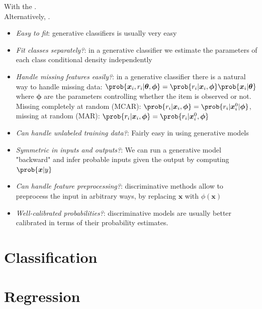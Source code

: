 With the .\\
Alternatively, .

\begin{itemize}
    \item \emph{Easy to fit}: generative classifiers is usually very easy
    \item \emph{Fit classes separately?}: in a generative classifier we estimate the parameters
        of each class conditional density independently
    \item \emph{Handle missing features easily?}: in a generative classifier there is a natural way
        to handle missing data: $\prob{\bm{x}_{i},r_{i}|\bm{\theta},\bm{\phi}} = \prob{r_{i}|\bm{
        x}_{i},\bm{\phi}}\prob{\bm{x}_{i}|\bm{\theta}}$ where $\bm{\phi}$ are the parameters
        controlling whether the item is observed or not. Missing completely at random (MCAR): $\prob{
        r_{i}|\bm{x}_{i},\bm{\phi}} = \prob{r_{i}|\bm{x}^{0}_{i}|\bm{\phi}}$, missing at random
        (MAR): $\prob{r_{i}|\bm{x}_{i},\bm{\phi}} = \prob{r_{i}|\bm{x}^{0}_{i},\bm{\phi}}$
    \item \emph{Can handle unlabeled training data?}: Fairly easy in using generative models
    \item \emph{Symmetric in inputs and outputs?}: We can run a generative model "backward" and
        infer probable inputs given the output by computing $\prob{\bm{x}|y}$
    \item \emph{Can handle feature preprocessing?}: discriminative methods allow to preprocess the
        input in arbitrary ways, by replacing $\bm{x}$ with $\phi(\bm{x})$
    \item \emph{Well-calibrated probabilities?}: discriminative models are usually better calibrated
        in terms of their probability estimates.
\end{itemize}

\section{Classification}


\section{Regression}


